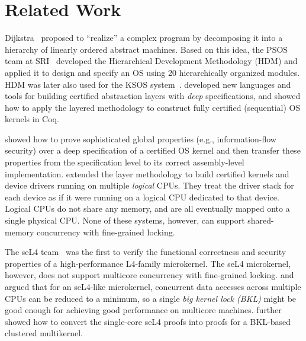 \section{Related Work}
\label{sec:related}

Dijkstra~\cite{dijkstra68a,Dijkstra72} proposed to ``realize'' a
complex program by decomposing it into a hierarchy of linearly ordered
abstract machines.  Based on this idea, the PSOS team at
SRI~\cite{psos80} developed the Hierarchical Development Methodology
(HDM) and applied it to design and specify an OS using 20
hierarchically organized modules. HDM was later also used for the KSOS
system~\cite{ksos84}.
\citet{dscal15} developed new languages and tools for building
certified abstraction layers with {\em deep} specifications, and
showed how to apply the layered methodology to construct fully
certified (sequential) OS kernels in Coq.

\citet{costanzo16} showed how to prove sophisticated global properties
(e.g., information-flow security) over a deep specification of a
certified OS kernel and then transfer these properties from the
specification level to its correct assembly-level implementation.
\citet{chen16} extended the layer methodology to build certified
kernels and device drivers running on multiple {\em logical}
CPUs. They treat the driver stack for each device as if it were
running on a logical CPU dedicated to that device. Logical CPUs do not
share any memory, and are all eventually mapped onto a single physical
CPU.
None of these systems, however, can support shared-memory concurrency
with fine-grained locking.


The seL4 team~\cite{klein2009sel4,klein14} was the first to verify the
functional correctness and security properties of a high-performance
L4-family microkernel. The seL4 microkernel, however, does not support
multicore concurrency with fine-grained locking.  \citet{peters15}
and \citet{vontessin13} argued that for an seL4-like microkernel,
concurrent data accesses across multiple CPUs can be reduced to a
minimum, so a single {\em big kernel lock (BKL)} might be good enough
for achieving good performance on multicore machines.
\citet{vontessin13} further showed how to convert the single-core seL4
proofs into proofs for a BKL-based clustered multikernel.

